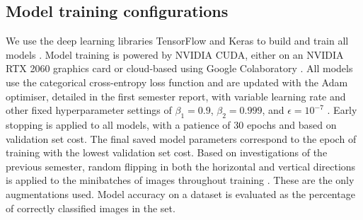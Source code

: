 \documentclass[12pt]{article}
\begin{document}


\subsection{Model training configurations}
We use the deep learning libraries TensorFlow and Keras to build and train all models \cite{Abadi16, Gulli17}. Model training is powered by NVIDIA CUDA, either on an NVIDIA RTX 2060 graphics card or cloud-based using Google Colaboratory \cite{Cook12, Bisong19}. All models use the categorical cross-entropy loss function and are updated with the Adam optimiser, detailed in the first semester report, with variable learning rate and other fixed hyperparameter settings of $\beta_1=0.9$, $\beta_2=0.999$, and $\epsilon=10^{-7}$ \cite{Heaton20, Kingma14}. Early stopping is applied to all models, with a patience of 30 epochs and based on validation set cost. The final saved model parameters correspond to the epoch of training with the lowest validation set cost. Based on investigations of the previous semester, random flipping in both the horizontal and vertical directions is applied to the minibatches of images throughout training \cite{Heaton20}. These are the only augmentations used. Model accuracy on a dataset is evaluated as the percentage of correctly classified images in the set. 
\end{document}
